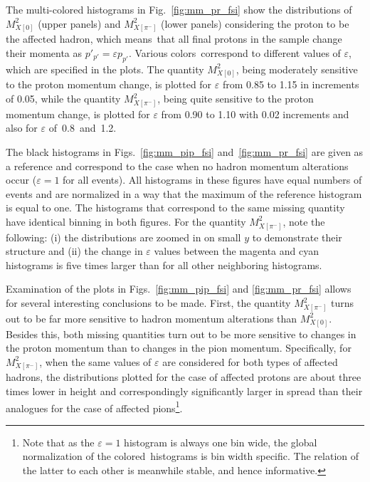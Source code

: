 The multi-colored histograms in Fig.~\ref{fig:mm_pr_fsi} show the distributions of $M_{X[0]}^{2}$ (upper panels) and $M_{X[\pi^{-}]}^{2}$ (lower panels) considering the proton to be the affected hadron, which means~that all final protons in the sample change their momenta as $p'_{p'} = \varepsilon p_{p'}$. Various colors~correspond to different values of $\varepsilon$, which are specified in the plots. The quantity $M_{X[0]}^{2}$, being moderately sensitive to the proton momentum change, is plotted for $\varepsilon$ from 0.85 to 1.15 in increments of 0.05, while the quantity $M_{X[\pi^{-}]}^{2}$, being quite sensitive to the proton momentum change, is plotted for $\varepsilon$ from 0.90 to 1.10 with 0.02 increments and also for $\varepsilon$ of~0.8~and~1.2.  

The black histograms in Figs.~\ref{fig:mm_pip_fsi} and~\ref{fig:mm_pr_fsi} are given as a reference and correspond to the case when no hadron momentum alterations occur ($\varepsilon = 1$ for all events). All histograms in these figures have equal numbers of events and are normalized in a way that the maximum of the reference histogram is equal to one. The histograms that correspond to the same missing quantity have identical binning in both figures. For the quantity $M_{X[\pi^{-}]}^{2}$, note the following: (i) the distributions are zoomed in on small $y$ to demonstrate their structure and (ii) the change in $\varepsilon$ values between the magenta and cyan histograms is five times larger than for all other neighboring histograms.


Examination of the plots in Figs.~\ref{fig:mm_pip_fsi} and \ref{fig:mm_pr_fsi} allows for several interesting conclusions to be made. First, the quantity $M_{X[\pi^{-}]}^{2}$ turns out to be far more sensitive to hadron momentum alterations than $M_{X[0]}^{2}$. Besides this, both missing quantities turn out to be more sensitive to changes in the proton momentum than to changes in the pion momentum. Specifically, for $M_{X[\pi^{-}]}^{2}$, when the same values of $\varepsilon$ are considered for both types of affected hadrons, the distributions plotted for the case of affected protons are about three times lower in height and correspondingly significantly larger in spread than their analogues for the case of affected pions\footnote[8]{Note that as the $\varepsilon\!=\!1$ histogram is always one bin wide, the global normalization of the colored~histograms is bin width specific. The relation of the latter to each other is meanwhile stable, and hence informative.}. 



